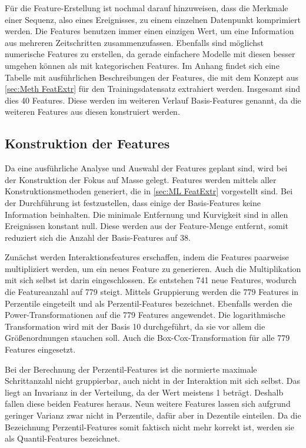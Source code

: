 Für die Feature-Erstellung ist nochmal darauf hinzuweisen, dass die Merkmale einer Sequenz, also eines Ereignisses, zu einem einzelnen Datenpunkt komprimiert werden. Die Features benutzen immer einen einzigen Wert, um eine Information aus mehreren Zeitschritten zusammenzufassen. Ebenfalls sind möglichst numerische Features zu erstellen, da gerade einfachere Modelle mit diesen besser umgehen können als mit kategorischen Features. Im Anhang findet sich eine Tabelle mit ausführlichen Beschreibungen der Features, die mit dem Konzept aus \autoref{sec:Meth FeatExtr} für den Trainingsdatensatz extrahiert werden. Insgesamt sind dies 40 Features. Diese werden im weiteren Verlauf Basis-Features genannt, da die weiteren Features aus diesen konstruiert werden.\par


\subsection{Konstruktion der Features} \label{sec:Meth KonstrFeatures}
Da eine ausführliche Analyse und Auswahl der Features geplant sind, wird bei der Konstruktion der Fokus auf Masse gelegt. Features werden mittels aller Konstruktionsmethoden generiert, die in \autoref{sec:ML FeatExtr} vorgestellt sind. Bei der Durchführung ist festzustellen, dass einige der Basis-Features keine Information beinhalten. Die minimale Entfernung und Kurvigkeit sind in allen Ereignissen konstant null. Diese werden aus der Feature-Menge entfernt, somit reduziert sich die Anzahl der Basis-Features auf 38.\par

Zunächst werden Interaktionsfeatures erschaffen, indem die Features paarweise multipliziert werden, um ein neues Feature zu generieren. Auch die Multiplikation mit sich selbst ist darin eingeschlossen. Es entstehen 741 neue Features, wodurch die Featureanzahl auf 779 steigt. Mittels Gruppierung werden die 779 Features in Perzentile eingeteilt und als Perzentil-Features bezeichnet. Ebenfalls werden die Power-Transformationen auf die 779 Features angewendet. Die logarithmische Transformation wird mit der Basis 10 durchgeführt, da sie vor allem die Größenordnungen stauchen soll. Auch die Box-Cox-Transformation für alle 779 Features eingesetzt. \par

Bei der Berechnung der Perzentil-Features ist die normierte maximale Schrittanzahl nicht gruppierbar, auch nicht in der Interaktion mit sich selbst. Das liegt an Invarianz in der Verteilung, da der Wert meistens 1 beträgt. Deshalb fallen diese beiden Features heraus. Neun weitere Features lassen sich aufgrund geringer Varianz zwar nicht in Perzentile, dafür aber in Dezentile einteilen. Da die Bezeichnung Perzentil-Features somit faktisch nicht mehr korrekt ist, werden sie als Quantil-Features bezeichnet. \par

